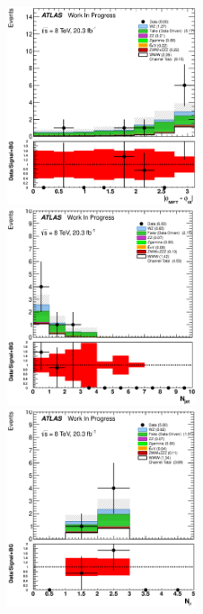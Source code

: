 \begin{figure}[ht!]
\centering
\includegraphics[width=0.495\textwidth]{figures/appendix_signal_selection/Nov24Update_FakeSys_KFacSys_LinearY_Rebin/output/jobs/MxM/DataFull_Rates_May13_FakeRatesExactly2Loose_MuonMxMBJetGt0_ElBJetGt0SubtractPC_MxM/PreselectionNov23_15_0SFOS_ChargeAbs1_BVeto85_SFMllGt20_SSMeeZVeto15_physics/weight_all/eps/DeltaPhiMET123_Abs_histratio.eps}
\includegraphics[width=0.495\textwidth]{figures/appendix_signal_selection/Nov24Update_FakeSys_KFacSys_LinearY_Rebin/output/jobs/MxM/DataFull_Rates_May13_FakeRatesExactly2Loose_MuonMxMBJetGt0_ElBJetGt0SubtractPC_MxM/PreselectionNov23_15_0SFOS_ChargeAbs1_BVeto85_SFMllGt20_SSMeeZVeto15_DeltaPhi2p5_physics/weight_all/eps/NJets_histratio.eps}
\includegraphics[width=0.495\textwidth]{figures/appendix_signal_selection/Nov24Update_FakeSys_KFacSys_LinearY_Rebin/output/jobs/MxM/DataFull_Rates_May13_FakeRatesExactly2Loose_MuonMxMBJetGt0_ElBJetGt0SubtractPC_MxM/PreselectionNov23_15_0SFOS_ChargeAbs1_BVeto85_SFMllGt20_SSMeeZVeto15_DeltaPhi2p5_NJetLt2_physics/weight_all/eps/NMuons_histratio.eps}


\end{figure}
